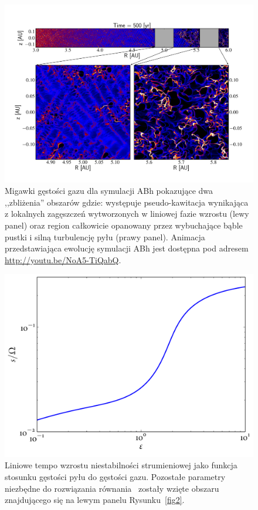 \begin{figure} 
\centering
\includegraphics[width=0.98\linewidth]{figures/fig3}
\caption{Migawki gęstości gazu dla symulacji ABh pokazujące dwa ,,zbliżenia''
   obszarów gdzie: występuje pseudo-kawitacja wynikająca z lokalnych zagęszczeń
   wytworzonych w liniowej fazie wzrostu (lewy panel) oraz region całkowicie
   opanowany przez wybuchające bąble pustki i silną turbulencję pyłu (prawy
   panel). Animacja przedstawiająca ewolucję symulacji ABh jest dostępna pod
   adresem \href{http://youtu.be/NoA5-TiQabQ}{http://youtu.be/NoA5-TiQabQ}.}
\label{fig3}
\end{figure}

\begin{figure}
   \centering
   \includegraphics[width=0.5\linewidth]{figures/growthAB}
   \caption{Liniowe tempo wzrostu niestabilności strumieniowej jako funkcja
      stosunku gęstości pyłu do gęstości gazu. Pozostałe parametry niezbędne do
      rozwiązania równania~ zostały wzięte obszaru znajdującego
   się na lewym panelu Rysunku~\ref{fig2}.}
   \label{fig2b}
\end{figure}


